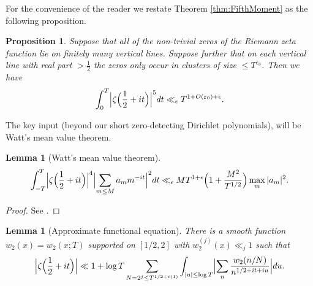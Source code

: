 \documentclass[12pt]{amsart}
\theoremstyle{plain}
\newtheorem{lemma}[theorem]{Lemma}
\newtheorem{proposition}[theorem]{Proposition}
\theoremstyle{definition}
\theoremstyle{remark}
\begin{document}
For the convenience of the reader we restate Theorem \ref{thm:FifthMoment} as the following proposition.
%
%
%
%
\begin{proposition}\label{prop:FifthMoment}
Suppose that all of the non-trivial zeros of the Riemann zeta function lie on finitely many vertical lines. Suppose further that on each vertical line with real part $> \frac{1}{2}$ the zeros only occur in clusters of size $\leq T^{\varepsilon_0}$. Then we have
\begin{align*}
\int_0^T \Bigl| \zeta \Bigl(\frac{1}{2}+it \Bigr) \Bigr|^{5}dt \ll_\epsilon T^{1+O(\varepsilon_0)+\epsilon}.
\end{align*}
\end{proposition}
%
%
%
%
The key input (beyond our short zero-detecting Dirichlet polynomials), will be Watt's mean value theorem.
%
%
%
%
\begin{lemma}[Watt's mean value theorem]\label{lem:WattMVT}
\begin{align*}
\int_{-T}^T \Bigl| \zeta \Bigl(\frac{1}{2}+it \Bigr) \Bigr|^4 \Bigl|\sum_{m \leq M} a_m m^{-it} \Bigr|^2dt \ll_\epsilon M T^{1+\epsilon} \Bigl(1 + \frac{M^2}{T^{1/2}} \Bigr) \max_m |a_m|^2.
\end{align*}
\end{lemma}
%
%
%
%
\begin{proof}
See \cite[Theorem 1]{Wat1995}.
\end{proof}
%
%
%
%
\begin{lemma}[Approximate functional equation]\label{lem:AppFuncEq}
There is a smooth function $w_2(x) = w_2(x;T)$ supported on $[1/2,2]$ with $w_2^{(j)}(x) \ll_j 1$ such that
\[
\Bigl|\zeta\Big(\frac{1}{2}+it\Bigr)\Bigr|\ll 1 + \log T\sum_{N=2^j\le T^{1/2+o(1)}}\int_{|u|\leq \log T} \Bigl|\sum_{n}\frac{w_2(n/N)}{n^{1/2+it+iu}}\Bigr| du.
\]
\end{lemma}
%
%
%
%
\end{document}
